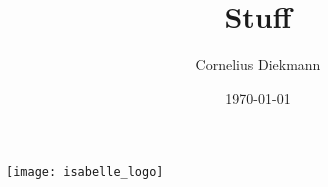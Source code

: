 \documentclass[a4paper,landscape]{foils}
\newcommand{\titlestyle}{\color{DarkGreen}}
\begin{document}
\title{\titlestyle Stuff}
\author{Cornelius Diekmann}
\date{\today{}}
\maketitle

\vfill
\begin{center}
  \texttt{[image: isabelle\_logo]}
\end{center}


\end{document}
